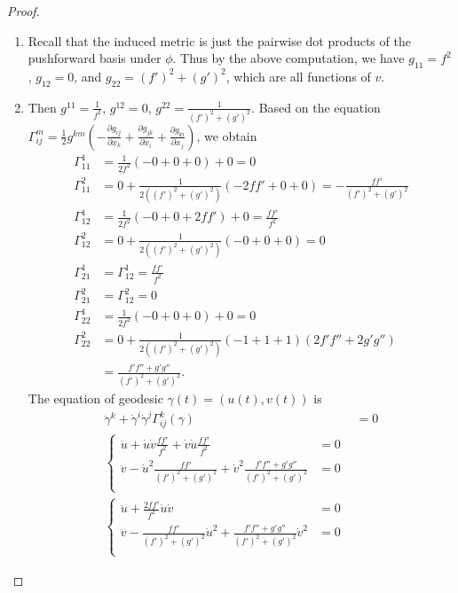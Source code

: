 \documentclass[12pt]{article}
\begin{document}
\begin{proof}
\begin{enumerate}[label=(\alph*)]
	\item Recall that the induced metric is just the pairwise dot products of the pushforward basis under $ \phi$. Thus by the above computation, we have $ g_{11} = f^2$, $ g_{12} = 0$, and $ g_{22} = (f')^2+(g')^2$, which are all functions of $ v$.
	\item Then $ g^{11} = \frac{1}{f^2}$, $ g^{12} = 0$, $ g^{22} = \frac{1}{(f')^2+(g')^2}$. Based on the equation $ \Gamma_{ij}^{m} = \frac{1}{2} g^{  km} \left(- \frac{\partial g_{ij}}{\partial x_k} + \frac{\partial g_{jk}}{\partial x_i}  + \frac{\partial g_{ki}}{\partial x_j}  \right) $, we obtain  
\begin{align*}
	\Gamma_{11}^{1} &= \frac{1}{2f^2} \left( -0+0+0 \right) + 0 = 0\\ 
	\Gamma_{11}^{2} &= 0 + \frac{1}{2((f')^2+(g')^2)} \left( -2ff' + 0 +0  \right) =-\frac{ff'}{(f')^2+(g')^2}    \\
	\Gamma_{12}^{1}&= \frac{1}{2f^2} (-0+0+2ff') + 0 =  \frac{ff'}{f^2 } \\
	\Gamma_{12}^{2} &= 0 + \frac{1}{2((f')^2+(g')^2)}(-0+0+0) = 0   \\
	\Gamma_{21}^{1} &= \Gamma_{12}^{1} = \frac{ff'}{f^2 } \\
	\Gamma_{21}^{2} &= \Gamma_{12}^{2}=0 \\
\Gamma_{22}^{1} &= \frac{1}{2f^2} ( -0+ 0+0)+ 0 = 0 \\
\Gamma_{22}^{2} &= 0 + \frac{1}{2((f')^2+(g')^2)}(-1+1+1) (2f'f''+2g'g'')  \\&= \frac{f'f''+g'g''}{(f')^2+(g')^2}   .
\end{align*}
The equation of geodesic $ \gamma(t) = (u(t),v(t)) $ is
\begin{align*}
	\ddot{ \gamma}^{k} + \dot{ \gamma}^{i} \dot{ \gamma}^{j} \Gamma_{ij}^{k}( \gamma) &= 0 \\ 
	\begin{cases}
	\ddot{u} + \dot{u} \dot{v} \frac{f f'}{ f^2} + \dot{v} \dot{u} \frac{ f f'}{f^2 } &= 0 \\
	\ddot{v} - \dot{u}^2 \frac{ff'}{ (f')^2+(g')^2}+ \dot{v}^2 \frac{f'f''+g'g''}{ (f')^2+(g')^2} &= 0 \\
	\end{cases}\\
	\begin{cases}
	\ddot{u} +  \frac{2f f'}{ f^2} \dot{u} \dot{v} &= 0 \\
	\ddot{v} -  \frac{ff'}{ (f')^2+(g')^2} \dot{u}^2+ \frac{f'f''+g'g''}{ (f')^2+(g')^2} \dot{v}^2 &= 0 \\

\end{cases}
\end{align*}
\end{enumerate}
\end{proof}
\end{document}
